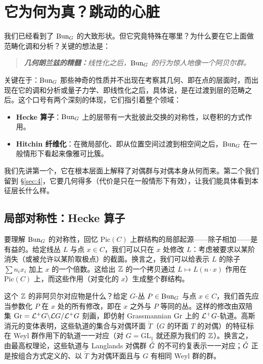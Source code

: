 \section{它为何为真？跳动的心脏}\label{sec:3}

我们已经看到了 $\operatorname{Bun}_{G}$ 的大致形状。但它究竟特殊在哪里？为什么要在它上面做范畴化调和分析？关键的想法是：

\begin{quote}
\itshape
\textbf{几何朗兰兹的精髓：}线性化之后，$\operatorname{Bun}_{G}$ 的行为惊人地像一个阿贝尔群。
\end{quote}

关键在于：$\operatorname{Bun}_{G}$ 那些神奇的性质并不出现在考察其几何、即在点的层面时，而出现在它的调和分析或量子力学、即线性化之后，具体说，是在过渡到层的范畴之后。这个口号有两个深刻的体现，它们指引着整个领域：

\begin{itemize}
\item \textbf{Hecke 算子}：$\operatorname{Bun}_{G}$ 上的层带有一大批彼此交换的对称性，以卷积的方式作用。
\item \textbf{Hitchin 纤维化}：在微局部化、即从位置空间过渡到相空间之后，$\operatorname{Bun}_{G}$ 在一般情形下看起来像雅可比簇。
\end{itemize}

我们先讲第一个，它在根本层面上解释了对偶群与对偶本身从何而来。第二个我们留到 \S\ref{sec:4}，它要几何得多（代价是只在一般情形下有效），让我们能具体看到本征层长什么样。

\subsection{局部对称性：Hecke 算子}\label{sec:3.1}

要理解 $\operatorname{Bun}_{G}$ 的对称性，回忆 $\mathrm{Pic}(C)$ 上群结构的局部起源——除子相加——是有益的。给定线丛 $L$ 与点 $x\in C$，我们可以只在 $x$ 处修改 $L$：考虑被要求以某阶消失（或被允许以某阶取极点）的截面。换言之，我们可以给表示 $L$ 的除子 $\sum n_{i}x_{i}$ 加上 $x$ 的一个倍数。这给出 $\mathbb{Z}$ 的一个拷贝通过 $L\mapsto L(n\cdot x)$ 作用在 $\mathrm{Pic}(C)$ 上，而这些作用（对变化的 $x$）生成整个群结构。

这个 $\mathbb{Z}$ 的非阿贝尔对应物是什么？给定 $G$-丛 $P\in\operatorname{Bun}_{G}$ 与点 $x\in C$，我们首先应当参数化 $P$ 在 $x$ 处的所有修改，即在 $x$ 之外与 $P$ 等同的丛。这样的修改由双陪集 $\operatorname{Gr}=\mathcal{L}^{+}G\backslash\mathcal{L}G/\mathcal{L}^{+}G$ 刻画，即仿射 Grassmannian $\operatorname{Gr}$ 上的 $\mathcal{L}^{+}G$-轨道。高斯消元的变体表明，这些轨道的集合与对偶环面 $\check T$（$G$ 的环面 $T$ 的对偶）的特征标在 Weyl 群作用下的轨道一一对应（对 $G=\mathrm{GL}_{1}$ 就还原为我们的 $\mathbb{Z}$）。换言之，由最高权理论，这些轨道与 Langlands 对偶群 $\check{G}$ 的不可约复表示一一对应；$\check{G}$ 正是按组合方式定义的、以 $\check T$ 为对偶环面且与 $G$ 有相同 Weyl 群的群。

